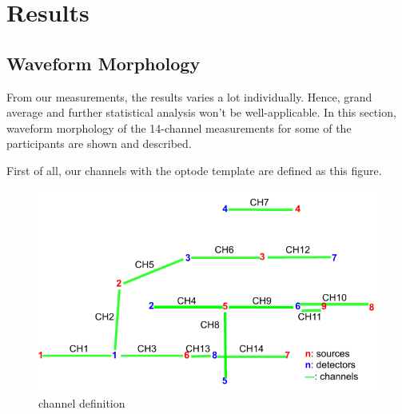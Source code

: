 \chapter{Results}
\section {Waveform Morphology}
From our measurements, the results varies a lot individually. Hence, grand average and further statistical analysis won't be well-applicable. In this section, waveform morphology of the 14-channel measurements for some of the participants are shown and described.

First of all, our channels with the optode template are defined as this figure.

\begin{figure}[H]
\centering
\begin{minipage}[c]{.75\linewidth}
  \centering
  \includegraphics[scale= 0.78, origin= c]{pdf/optode_template.pdf}
  \caption{channel definition}
\end{minipage} \hfill
\begin{minipage}[c]{.22\linewidth}
  \centering

\end{minipage}
\end{figure}
